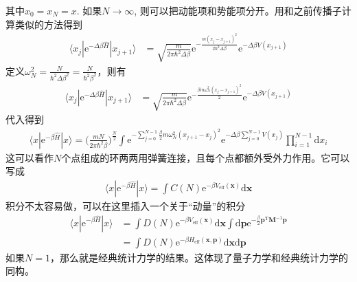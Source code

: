 \documentclass[12pt]{article}
\begin{document}
    其中$x_0=x_N = x$. 如果$N \to \infty$, 则可以把动能项和势能项分开。用和之前传播子计算类似的方法得到
    \begin{equation}\begin{aligned}
        \langle x_j|\mathrm{e}^{-\Delta \beta \hat{H}} |x_{j+1} \rangle &= \sqrt{\frac m{2\pi \hbar^2 \Delta \beta}} \mathrm{e}^{-\frac {m(x_j- x_{j+1})^2}{2\hbar^2 \Delta \beta}} \mathrm{e}^{-\Delta \beta V(x_{j+1})}
    \end{aligned}\end{equation}
    定义$\omega_N^2 = \frac N{\hbar^2 \Delta \beta^2} = \frac N{\hbar^2 \beta^2}$，则有
    \begin{equation}\begin{aligned}
        \langle x_j|\mathrm{e}^{-\Delta \beta \hat{H}} |x_{j+1} \rangle &= \sqrt{\frac m{2\pi \hbar^2 \Delta \beta}} \mathrm{e}^{-\frac {\beta m\omega_N^2(x_j- x_{j+1})^2}{2}} \mathrm{e}^{-\Delta \beta V(x_{j+1})}
    \end{aligned}\end{equation}
    代入得到 
    \begin{equation}\begin{aligned}
        \langle x|\mathrm{e}^{-\beta \hat{H}}|x\rangle  = \bigg(\frac {mN}{2\pi \hbar^2 \beta}\bigg)^{\frac N2} \int \mathrm{e}^{-\sum_{j=0}^{N-1} \frac {\beta}2 m \omega_N^2 (x_{j+1} - x_j)^2} \mathrm{e}^{-\Delta \beta \sum_{j=0}^{N-1}V(x_j)}\prod_{i=1}^{N-1}\mathrm{d}x_i
    \end{aligned}\end{equation}
    这可以看作$N$个点组成的环两两用弹簧连接，且每个点都额外受外力作用。它可以写成
    \begin{equation}\begin{aligned}
        \langle x|\mathrm{e}^{-\beta \hat{H}}|x\rangle  = \int C(N) \mathrm{e}^{-\beta V_{\mathrm{eff}}(\bm{x})} \mathrm{d}\bm{x}
    \end{aligned}\end{equation}
    积分不太容易做，可以在这里插入一个关于“动量”的积分
    \begin{equation}\begin{aligned}
        \langle x|\mathrm{e}^{-\beta \hat{H}}|x\rangle  &= \int D(N) \mathrm{e}^{-\beta V_{\mathrm{eff}}(\bm{x})} \mathrm{d}\bm{x} \int \mathrm{d}\bm{p} \mathrm{e}^{-\frac {\beta}2 \bm{p}^{\mathrm{T}}\bm{M}^{-1} \bm{p}}\\
        &= \int D(N) \mathrm{e}^{-\beta H_{\mathrm{eff}}(\bm{x,p})} \mathrm{d}\bm{x} \mathrm{d}\bm{p}
    \end{aligned}\end{equation}
    如果$N=1$，那么就是经典统计力学的结果。这体现了量子力学和经典统计力学的同构。
\end{document}
